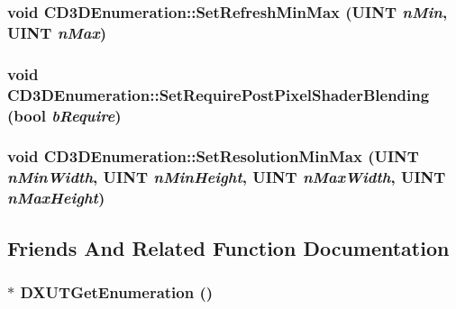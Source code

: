 \label{class_c_d3_d_enumeration_acc023b14d22d5a56f4c20c84bd1fbdb5}
\hypertarget{class_c_d3_d_enumeration_a13f65056cc94cb49eacbaf44a7f08ac8}{
\subsubsection[{SetRefreshMinMax}]{\setlength{\rightskip}{0pt plus 5cm}void CD3DEnumeration::SetRefreshMinMax (UINT {\em nMin}, \/  UINT {\em nMax})}}
\label{class_c_d3_d_enumeration_a13f65056cc94cb49eacbaf44a7f08ac8}
\hypertarget{class_c_d3_d_enumeration_a7e4ccfa7f3ae0f393560d9c2b2e266d2}{
\subsubsection[{SetRequirePostPixelShaderBlending}]{\setlength{\rightskip}{0pt plus 5cm}void CD3DEnumeration::SetRequirePostPixelShaderBlending (bool {\em bRequire})}}
\label{class_c_d3_d_enumeration_a7e4ccfa7f3ae0f393560d9c2b2e266d2}
\hypertarget{class_c_d3_d_enumeration_abbf7dde5303569d4c3c0591962963b93}{
\subsubsection[{SetResolutionMinMax}]{\setlength{\rightskip}{0pt plus 5cm}void CD3DEnumeration::SetResolutionMinMax (UINT {\em nMinWidth}, \/  UINT {\em nMinHeight}, \/  UINT {\em nMaxWidth}, \/  UINT {\em nMaxHeight})}}
\label{class_c_d3_d_enumeration_abbf7dde5303569d4c3c0591962963b93}


\subsection{Friends And Related Function Documentation}
\hypertarget{class_c_d3_d_enumeration_a36f187d396a6e71a483f426d9beb0ed0}{
\subsubsection[{DXUTGetEnumeration}]{$\ast$ DXUTGetEnumeration ()}}
\label{class_c_d3_d_enumeration_a36f187d396a6e71a483f426d9beb0ed0}


